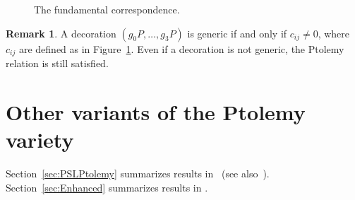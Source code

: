 \documentclass[11pt]{amsart}
\theoremstyle{plain}
\theoremstyle{definition}
\newtheorem{remark}[theorem]{Remark}
\numberwithin{equation}{section}
\newcommand{\Vector}[2]{\left(\begin{smallmatrix}#1\\#2\end{smallmatrix}\right)}
\def\editMatthias{$\diamondsuit$}
\begin{document}









\begin{figure}[htb]
\scalebox{0.68}{}
\caption{The fundamental correspondence.}\label{fig:FundamentalCorrespondence}
\end{figure}


\begin{remark}\label{rm:NonGenericDecoration}
A decoration $(g_0P,\dots,g_3P)$ is generic if and only if $c_{ij}\neq0$, where $c_{ij}$ are defined as in Figure~\ref{fig:FundamentalCorrespondence}. Even if a decoration is not generic, the Ptolemy relation is still satisfied.
\end{remark}





\section{Other variants of the Ptolemy variety}\label{sec:OtherVariants}
Section~\ref{sec:PSLPtolemy} summarizes results in~\cite{GaroufalidisThurstonZickert} (see also~\cite{PtolemyField}). Section~\ref{sec:Enhanced} summarizes results in \cite{ZickertEnhancedPtolemy}. 
\end{document}
